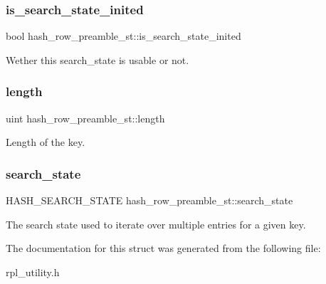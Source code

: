 \subsubsection{\texorpdfstring{is\+\_\+search\+\_\+state\+\_\+inited}{is\_search\_state\_inited}}
{\footnotesize\ttfamily bool hash\+\_\+row\+\_\+preamble\+\_\+st\+::is\+\_\+search\+\_\+state\+\_\+inited}

Wether this search\+\_\+state is usable or not. \mbox{\label{structhash__row__preamble__st_a5a17450dc10d7103def2123d9fccc27f}} 
\subsubsection{\texorpdfstring{length}{length}}
{\footnotesize\ttfamily uint hash\+\_\+row\+\_\+preamble\+\_\+st\+::length}

Length of the key. \mbox{\label{structhash__row__preamble__st_a8e3514148639e988c11c87b9ea601dc8}} 
\subsubsection{\texorpdfstring{search\+\_\+state}{search\_state}}
{\footnotesize\ttfamily H\+A\+S\+H\+\_\+\+S\+E\+A\+R\+C\+H\+\_\+\+S\+T\+A\+TE hash\+\_\+row\+\_\+preamble\+\_\+st\+::search\+\_\+state}

The search state used to iterate over multiple entries for a given key. 

The documentation for this struct was generated from the following file\+:\begin{DoxyCompactItemize}
\item 
rpl\+\_\+utility.\+h\end{DoxyCompactItemize}
